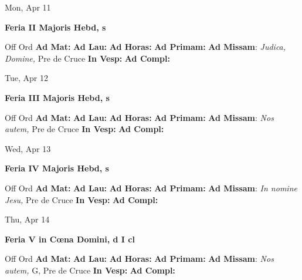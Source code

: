 \documentclass[10pt]{article}
\begin{document}
\begin{minipage}{3.5in}
\vspace{2em}\begin{center}
Mon, Apr 11
\end{center}\textbf{ \large Feria II Majoris Hebd, \textnormal{\normalsize s}}
\begin{justify}
Off Ord
\textbf{Ad Mat: }
\textbf{Ad Lau: }
\textbf{Ad Horas: }
\textbf{Ad Primam: }
\textbf{Ad Missam}: \textit{Judica, Domine,} Pre de Cruce
\textbf{In Vesp: }
\textbf{Ad Compl: }\end{justify}
\end{minipage}



\begin{minipage}{3.5in}
\vspace{2em}\begin{center}
Tue, Apr 12
\end{center}\textbf{ \large Feria III Majoris Hebd, \textnormal{\normalsize s}}
\begin{justify}
Off Ord
\textbf{Ad Mat: }
\textbf{Ad Lau: }
\textbf{Ad Horas: }
\textbf{Ad Primam: }
\textbf{Ad Missam}: \textit{Nos autem,} Pre de Cruce
\textbf{In Vesp: }
\textbf{Ad Compl: }\end{justify}
\end{minipage}



\begin{minipage}{3.5in}
\vspace{2em}\begin{center}
Wed, Apr 13
\end{center}\textbf{ \large Feria IV Majoris Hebd, \textnormal{\normalsize s}}
\begin{justify}
Off Ord
\textbf{Ad Mat: }
\textbf{Ad Lau: }
\textbf{Ad Horas: }
\textbf{Ad Primam: }
\textbf{Ad Missam}: \textit{In nomine Jesu,} Pre de Cruce
\textbf{In Vesp: }
\textbf{Ad Compl: }\end{justify}
\end{minipage}



\begin{minipage}{3.5in}
\vspace{2em}\begin{center}
Thu, Apr 14
\end{center}\textbf{ \large Feria V in Cœna Domini, \textnormal{\normalsize d I cl}}
\begin{justify}
Off Ord
\textbf{Ad Mat: }
\textbf{Ad Lau: }
\textbf{Ad Horas: }
\textbf{Ad Primam: }
\textbf{Ad Missam}: \textit{Nos autem,} G, Pre de Cruce
\textbf{In Vesp: }
\textbf{Ad Compl: }\end{justify}
\end{minipage}
\end{document}
